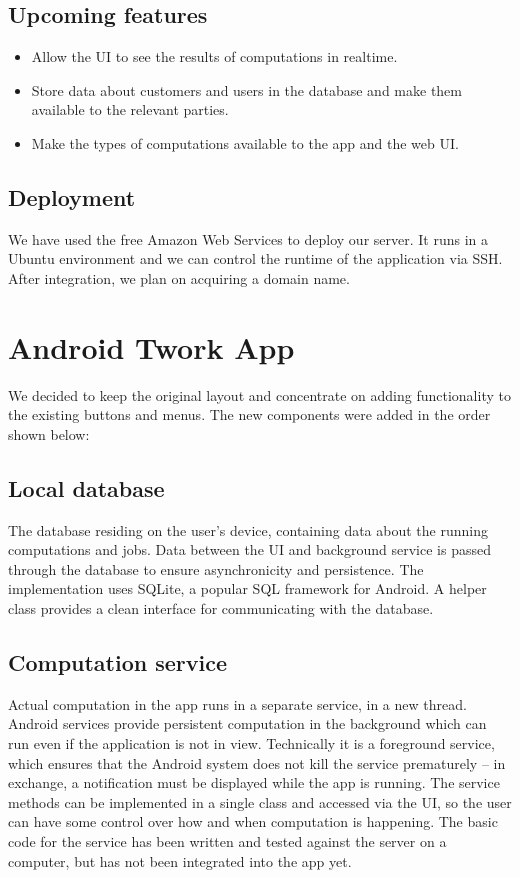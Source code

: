 \documentclass[a4paper,10pt]{article}
\begin{document}
\subsection{Upcoming features}

\begin{itemize}
\item Allow the UI to see the results of computations in realtime.
\item Store data about customers and users  in the database and make them available to the relevant parties.
\item Make the types of computations available to the app and the web UI.
\end{itemize}

\subsection{Deployment}
We have used the free Amazon Web Services to deploy our server. It runs in a Ubuntu environment and we can control the runtime of the application via SSH.
After integration, we plan on acquiring a domain name.




\section{Android Twork App}


We decided to keep the original layout and concentrate on adding functionality to the existing buttons and menus. The new components were added in the order shown below:

\subsection{Local database} The database residing on the user's device, containing data about the running computations and jobs. Data between the UI and background service is passed through the database to ensure asynchronicity and persistence. The implementation uses SQLite, a popular SQL framework for Android. A helper class provides a clean interface for communicating with the database.
\subsection{Computation service} Actual computation in the app runs in a separate service, in a new thread. Android services provide persistent computation in the background which can run even if the application is not in view. Technically it is a foreground service, which ensures that the Android system does not kill the service prematurely -- in exchange, a notification must be displayed while the app is running. The service methods can be implemented in a single class and accessed via the UI, so the user can have some control over how and when computation is happening.
The basic code for the service has been written and tested against the server on a computer, but has not been integrated into the app yet.
\end{document}
